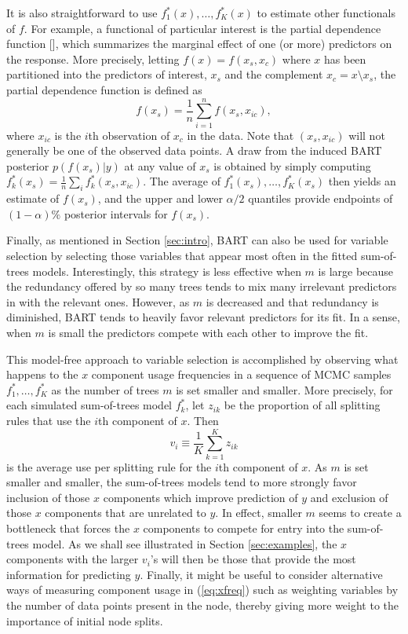 \documentclass[aoas,nameyear,dvips]{arximspdf}
\begin{document}
It is also straightforward to use $f^*_1(x),\dots,f^*_K(x)$ to  estimate
other functionals of $f$.  For example, a functional of particular interest is the
partial dependence function [\citet{Fri2001}], which summarizes the
marginal effect of one (or more) predictors on the response.  More precisely,
letting $f(x) = f(x_s,x_c)$ where $x$ has been partitioned into the predictors of interest, $x_s$
and the complement $x_c=x\setminus x_s$, the partial dependence function is defined as
\begin{equation}\label{eq:pdsum}
f(x_s) = \frac{1}{n}\sum_{i=1}^n f(x_s,x_{ic}),
\end{equation}
where $x_{ic}$ is the $i$th observation of $x_c$ in the data. Note
that $(x_s,x_{ic})$ will not generally be one of the observed data
points.  A draw from the induced BART posterior $p(f(x_s) |  y)$ at any value of $x_s$ is obtained by
simply computing $f^*_k(x_s)= \frac{1}{n}\sum_i f^*_k(x_s,x_{ic})$.  The average of $f^*_1(x_s),\dots,f^*_K(x_s)$ then yields an
estimate of $f(x_s)$, and the upper and lower $\alpha/2$ quantiles  provide endpoints
of $(1-\alpha)\%$ posterior intervals for $f(x_s)$.


Finally, as mentioned in Section \ref{sec:intro}, BART can also be used
for variable selection by selecting those variables that appear most
often in the fitted sum-of-trees models.  Interestingly, this strategy
is less effective when $m$ is large because the redundancy offered by
so many trees tends to mix many irrelevant predictors in with the
relevant ones.  However, as $m$ is decreased and that redundancy is
diminished, BART tends to heavily favor relevant predictors for its
fit.  In a sense, when $m$ is small the predictors compete with each
other to improve the fit.

This model-free approach to variable selection is accomplished by
observing what happens to the $x$ component usage frequencies in a
sequence of MCMC samples $f^*_1,\dots,f^*_K$ as the number of trees $m$
is set smaller and smaller.  More precisely, for each simulated
sum-of-trees model $f^*_k$, let $z_{ik}$ be the proportion of all
splitting rules that use the $i$th component of $x$.  Then
\begin{equation}\label{eq:xfreq}
v_i \equiv \frac {1}{K} \sum_{k=1}^K z_{ik}
\end{equation}
is the average use per splitting rule for the $i$th component of $x$.
As $m$ is set smaller and smaller, the sum-of-trees models tend to more
strongly favor inclusion of those $x$ components which improve
prediction of $y$ and exclusion of those $x$ components that are
unrelated to $y$.  In effect,  smaller $m$ seems to create a bottleneck
that forces the $x$ components to compete for entry into the
sum-of-trees model.  As we shall see illustrated in Section
\ref{sec:examples}, the $x$ components with the larger $v_i$'s will
then be those that provide the most information for predicting $y$.
Finally, it might be useful to consider alternative ways of measuring
component usage in (\ref{eq:xfreq}) such as weighting variables by the
number of data points present in the node, thereby giving more weight
to the importance of initial node splits.
\end{document}
